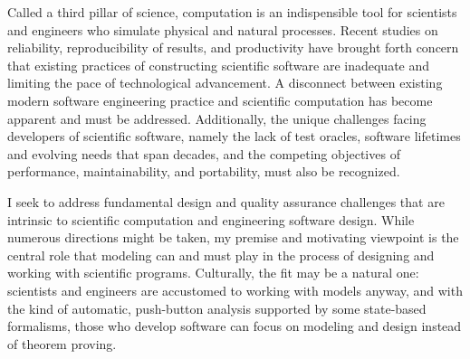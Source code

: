 \documentclass[../../proposal.tex]{subfiles}
\begin{document}
Called a third pillar of science, computation is an indispensible tool
for scientists and engineers who simulate physical and natural
processes.  Recent studies on reliability, reproducibility of results,
and productivity have brought forth concern that existing practices of
constructing scientific software are inadequate and limiting the pace
of technological advancement.  A disconnect between existing modern
software engineering practice and scientific computation has become
apparent and must be addressed.  Additionally, the unique challenges
facing developers of scientific software, namely the lack of test
oracles, software lifetimes and evolving needs that span decades, and
the competing objectives of performance, maintainability, and
portability, must also be recognized.

I seek to address fundamental design and quality assurance challenges
that are intrinsic to scientific computation and engineering software
design.  While numerous directions might be taken, my premise and
motivating viewpoint is the central role that modeling can and must
play in the process of designing and working with scientific programs. 
Culturally, the fit may be a natural one: scientists and engineers are
accustomed to working with models anyway, and with the kind of
automatic, push-button analysis supported by some state-based
formalisms, those who develop software can focus on modeling and design
instead of theorem proving.
\end{document}
